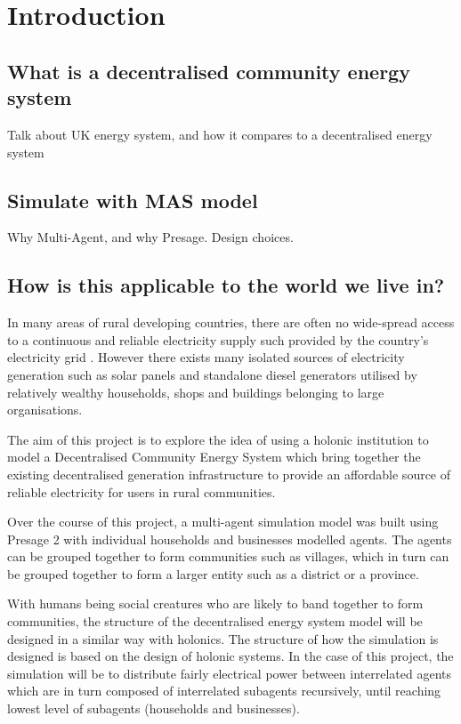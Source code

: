 \chapter{Introduction}
\label{introduction}

\section*{What is a decentralised community energy system}
Talk about UK energy system, and how it compares to a decentralised energy system

\section*{Simulate with MAS model}
Why Multi-Agent, and why Presage.
Design choices.

\section*{How is this applicable to the world we live in?}
In many areas of rural developing countries, there are often no wide-spread access to a continuous and reliable electricity supply such provided by the country's electricity grid \cite{IEA-web:2015}. However there exists many isolated sources of electricity generation such as solar panels and standalone diesel generators utilised by relatively wealthy households, shops and buildings belonging to large organisations. 

The aim of this project is to explore the idea of using a holonic institution to model a Decentralised Community Energy System which bring together the existing decentralised generation infrastructure to provide an affordable source of reliable electricity for users in rural communities. 

Over the course of this project, a multi-agent simulation model was built using Presage 2 with individual households and businesses modelled agents. The agents can be grouped together to form communities such as villages, which in turn can be grouped together to form a larger entity such as a district or a province. 

With humans being social creatures who are likely to band together to form communities, the structure of the decentralised energy system model will be designed in a similar way with holonics. The structure of how the simulation is designed is based on the design of holonic systems. In the case of this project, the simulation will be to distribute fairly electrical power between interrelated agents which are in turn composed of interrelated subagents recursively, until reaching lowest level of subagents (households and businesses). 

